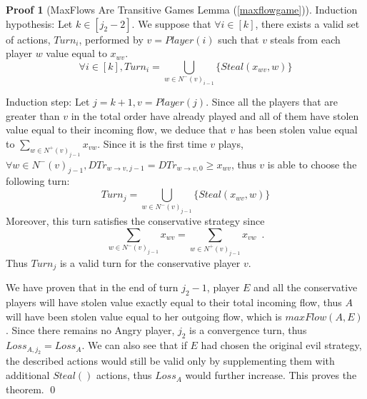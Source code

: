 \documentclass[11pt]{llncs}
\theoremstyle{definition}
\newtheorem*{sepproof}{Proof}
\begin{document}
\begin{sepproof}[MaxFlows Are Transitive Games Lemma (\ref{maxflowgame})]
       Induction hypothesis: Let $k \in [j_2 - 2]$. We suppose that $\forall i \in [k]$, there exists a valid set of actions,
       $Turn_i$, performed by $v = Player\left(i\right)$ such that $v$ steals from each player $w$ value equal to $x_{wv}$.
       \begin{equation*}
          \forall i \in [k], Turn_i = \bigcup\limits_{w \in N^{-}\left(v\right)_{i-1}}\{Steal\left(x_{wv}, w\right)\}
       \end{equation*}

       Induction step: Let $j = k + 1, v = Player\left(j\right)$. Since all the players that are greater than $v$ in the
       total order have already played and all of them have stolen value equal to their incoming flow, we deduce that $v$ has
       been stolen value equal to $\sum\limits_{w \in N^{+}\left(v\right)_{j-1}}x_{vw}$. Since it is the first time $v$
       plays, $\forall w \in N^{-}\left(v\right)_{j-1}, DTr_{w \rightarrow v, j-1} = DTr_{w \rightarrow v, 0} \geq x_{wv}$, thus
       $v$ is able to choose the following turn:
       \begin{equation*}
          Turn_j = \bigcup\limits_{w \in N^{-}\left(v\right)_{j-1}}\{Steal\left(x_{wv}, w\right)\}
       \end{equation*}
       Moreover, this turn satisfies the conservative strategy since
       \begin{equation*}
          \sum\limits_{w \in N^{-}\left(v\right)_{j-1}}x_{wv} = \sum\limits_{w \in N^{+}\left(v\right)_{j-1}}x_{vw} \enspace.
       \end{equation*}
       Thus $Turn_j$ is a valid turn for the conservative player $v$.

       We have proven that in the end of turn $j_2 - 1$, player $E$ and all the conservative players will have stolen value
       exactly equal to their total incoming flow, thus $A$ will have been stolen value equal to her outgoing flow, which is
       $maxFlow(A, E)$. Since there remains no Angry player, $j_2$ is a convergence turn, thus $Loss_{A, j_2} = Loss_A$. We
       can also see that if $E$ had chosen the original evil strategy, the described actions would still be valid only by
       supplementing them with additional $Steal\left(\right)$ actions, thus $Loss_A$ would further increase. This proves the
       theorem. \qed
    \end{sepproof}
\end{document}
